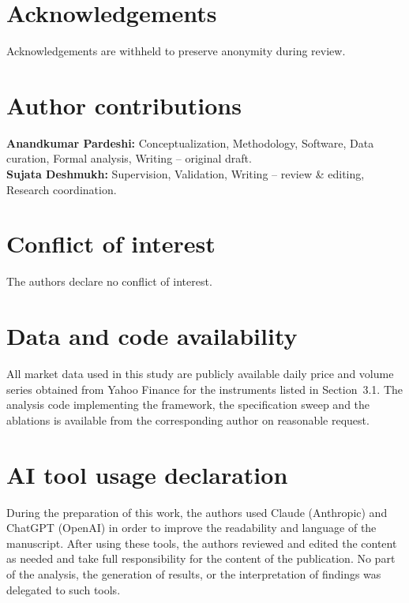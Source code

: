 \documentclass{singlecol-new}
\theoremstyle{TH}{
\newtheorem{lemma}{Lemma}
\newtheorem{theorem}[lemma]{Theorem}
\newtheorem{corrolary}[lemma]{Corrolary}
\newtheorem{conjecture}[lemma]{Conjecture}
\newtheorem{proposition}[lemma]{Proposition}
\newtheorem{claim}[lemma]{Claim}
\newtheorem{stheorem}[lemma]{Wrong Theorem}
\newtheorem{algorithm}{Algorithm}
}
\theoremstyle{THrm}{
\newtheorem{definition}{Definition}[section]
\newtheorem{question}{Question}[section]
\newtheorem{remark}{Remark}
\newtheorem{scheme}{Scheme}
}
\theoremstyle{THhit}{
\newtheorem{case}{Case}[section]
}
\begin{document}
\section*{Acknowledgements}
\label{sec:declarations}
Acknowledgements are withheld to preserve anonymity during review.

\section*{Author contributions}
\textbf{Anandkumar Pardeshi:} Conceptualization, Methodology, Software, Data curation,
Formal analysis, Writing -- original draft.\\
\textbf{Sujata Deshmukh:} Supervision, Validation, Writing -- review \& editing,
Research coordination.

\section*{Conflict of interest}
The authors declare no conflict of interest.

\section*{Data and code availability}
All market data used in this study are publicly available daily price and volume series
obtained from Yahoo Finance for the instruments listed in Section~3.1. The analysis code
implementing the framework, the specification sweep and the ablations is available from
the corresponding author on reasonable request.

\section*{AI tool usage declaration}
During the preparation of this work, the authors used Claude (Anthropic) and ChatGPT
(OpenAI) in order to improve the readability and language of the manuscript. After
using these tools, the authors reviewed and edited the content as needed and take full
responsibility for the content of the publication. No part of the analysis, the
generation of results, or the interpretation of findings was delegated to such tools.
\end{document}
